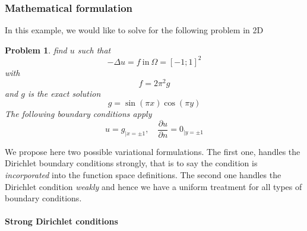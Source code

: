 \documentclass[a4paper]{book}
\newtheorem{problem}{Problem}
\begin{document}
\subsubsection{Mathematical formulation}
\label{sec:math-form-3}
In this example, we would like to solve for the following problem in 2D
\begin{problem}
\label{prob:1}
 find $u$ such that
\begin{equation}
  \label{eq:1}
  -\Delta u = f\ \text{in}\ \Omega = [-1;1]^2
\end{equation}
with
\begin{equation}
  \label{eq:2}
  f= 2 \pi^2  g
\end{equation}
and $g$ is the exact solution
\begin{equation}
  \label{eq:3}
  g=\sin(\pi x) \cos(\pi y)
\end{equation}
The following boundary conditions apply
\begin{equation}
  \label{eq:4}
  u=g_{|x=\pm 1}, \quad \frac{\partial u}{\partial n} = 0_{|y=\pm 1}
\end{equation}
\end{problem}

We propose here two possible variational formulations. The first one,
handles the Dirichlet boundary conditions strongly, that is to say the
condition is \emph{incorporated} into the function space definitions.
The second one handles the Dirichlet condition \emph{weakly} and hence
we have a uniform treatment for all types of boundary conditions.



\paragraph{Strong Dirichlet conditions}
\label{sec:strong-dirichl-cond}
\end{document}
